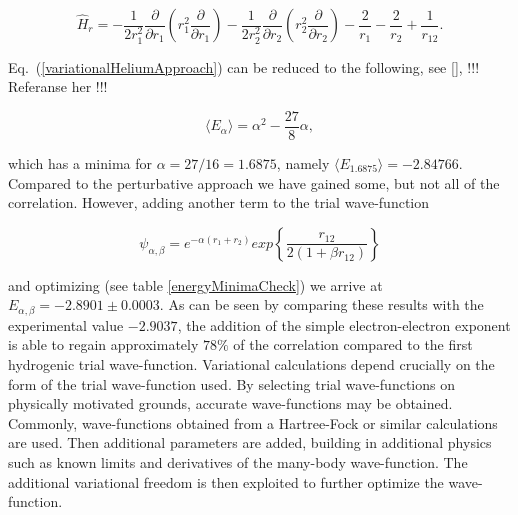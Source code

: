 \begin{equation*}
  \hat{H}_r = -\frac{1}{2r_1^2} \frac{\partial}{\partial r_1} \left( r_1^2
  \frac{\partial}{\partial r_1}\right) - \frac{1}{2r_2^2}
  \frac{\partial}{\partial r_2} \left( r_2^2 \frac{\partial}{\partial
  r_2}\right) - \frac{2}{r_1} - \frac{2}{r_2} + \frac{1}{r_{12}}.
\end{equation*}



Eq.~(\ref{variationalHeliumApproach}) can be reduced to the following,
see \ref{}, \newline \newline !!! Referanse her !!! \newline \newline

\begin{equation}
  \langle E_{\alpha} \rangle = \alpha^2 - \frac{27}{8}\alpha,
\end{equation}

which has a minima for $\alpha = 27/16 = 1.6875$, namely 
$\langle E_{1.6875} \rangle = -2.84766$. 
\newline
%
\newline
Compared to the perturbative approach we have gained some, but not
all of the correlation. However, adding another term to the trial
wave-function

\begin{equation*} 
  \psi_{\alpha,\beta} 
  = e^{-\alpha (r_1+r_2)} exp \left\{ \frac{r_{12}} {2(1+\beta
  r_{12})} \right\}
\end{equation*}

and optimizing (see table \ref{energyMinimaCheck}) we arrive at
$E_{\alpha,\beta} = -2.8901 \pm 0.0003$. As 
can be seen by comparing these results with the experimental value
$-2.9037$, the addition of the simple electron-electron exponent is able
to regain approximately $78\%$ of the correlation compared to the
first hydrogenic trial wave-function. 
\newline
%
\newline
Variational calculations depend crucially on the form of the trial
wave-function used. By selecting trial wave-functions on physically
motivated grounds, accurate wave-functions may be obtained. Commonly,
wave-functions obtained from a Hartree-Fock or similar calculations are
used. Then additional parameters are added, building in additional
physics such as known limits and derivatives of the many-body
wave-function. The additional variational freedom is then exploited to
further optimize the wave-function.

